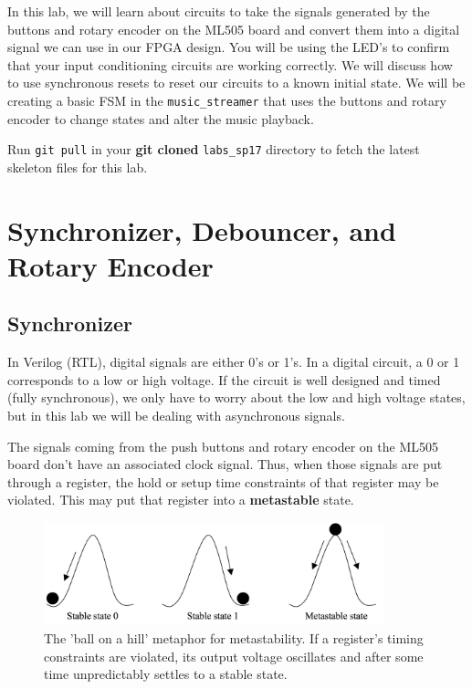 \documentclass[11pt]{article}
\begin{document}
In this lab, we will learn about circuits to take the signals generated by the buttons and rotary encoder on the ML505 board and convert them into a digital signal we can use in our FPGA design. You will be using the LED's to confirm that your input conditioning circuits are working correctly. We will discuss how to use synchronous resets to reset our circuits to a known initial state. We will be creating a basic FSM in the \verb|music_streamer| that uses the buttons and rotary encoder to change states and alter the music playback.

Run \verb|git pull| in your \textbf{git cloned} \verb|labs_sp17| directory to fetch the latest skeleton files for this lab.

\section{Synchronizer, Debouncer, and Rotary Encoder}

\subsection{Synchronizer}
In Verilog (RTL), digital signals are either 0's or 1's. In a digital circuit, a 0 or 1 corresponds to a low or high voltage. If the circuit is well designed and timed (fully synchronous), we only have to worry about the low and high voltage states, but in this lab we will be dealing with asynchronous signals.

The signals coming from the push buttons and rotary encoder on the ML505 board don't have an associated clock signal. Thus, when those signals are put through a register, the hold or setup time constraints of that register may be violated. This may put that register into a \textbf{metastable} state.

\begin{figure}[H]
	\centerline{\includegraphics[height=3cm]{images/lab2_fig3.png}}
	\caption{The 'ball on a hill' metaphor for metastability. If a register's timing constraints are violated, its output voltage oscillates and after some time unpredictably settles to a stable state.}
\end{figure}
\end{document}
